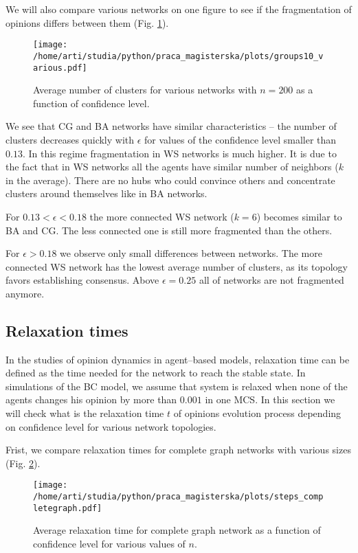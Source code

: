 \documentclass[a4paper, 12pt]{article}
\begin{document}
\indent

We will also compare various networks on one figure to see if the fragmentation of opinions differs between them (Fig. \ref{f30}).

\begin{figure}[H]
		\centering
		\texttt{[image: /home/arti/studia/python/praca\_magisterska/plots/groups10\_various.pdf]}
		\caption{Average number of clusters for various networks with $n=200$ as a function of confidence level.}
		\label{f30}
\end{figure}

We see that CG and BA networks have similar characteristics -- the number of clusters decreases quickly with $\epsilon$ for values of the confidence level smaller than $0.13$. In this regime fragmentation in WS networks is much higher. It is due to the fact that in WS networks all the agents have similar number of neighbors ($k$ in the average). There are no hubs who could convince others and concentrate clusters around themselves like in BA networks. 
\indent

For $0.13<\epsilon<0.18$ the more connected WS network ($k=6$) becomes similar to BA and CG. The less connected one is still more fragmented than the others.
\indent

For $\epsilon>0.18$ we observe only small differences between networks. The more connected WS network has the lowest average number of clusters, as its topology favors establishing consensus. Above $\epsilon=0.25$ all of networks are not fragmented anymore.


\subsection{Relaxation times}
In the studies of opinion dynamics in agent--based models, relaxation time can be defined as the time needed for the network to reach the stable state. In simulations of the BC model, we assume that system is relaxed when none of the agents changes his opinion by more than $0.001$ in one MCS. In this section we will check what is the relaxation time $t$ of opinions evolution process depending on confidence level for various network topologies.

\indent

Frist, we compare relaxation times for complete graph networks with various sizes (Fig. \ref{f31}).

\begin{figure}[H]
		\centering
		\texttt{[image: /home/arti/studia/python/praca\_magisterska/plots/steps\_completegraph.pdf]}
		\caption{Average relaxation time for complete graph network as a function of confidence level for various values of $n$.}
		\label{f31}
\end{figure}
\end{document}
